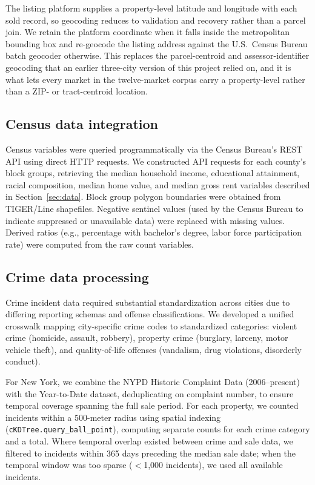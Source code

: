 \documentclass{article}
\begin{document}
The listing platform supplies a property-level latitude and longitude with each sold record, so geocoding reduces to validation and recovery rather than a parcel join. We retain the platform coordinate when it falls inside the metropolitan bounding box and re-geocode the listing address against the U.S.\ Census Bureau batch geocoder otherwise. This replaces the parcel-centroid and assessor-identifier geocoding that an earlier three-city version of this project relied on, and it is what lets every market in the twelve-market corpus carry a property-level rather than a ZIP- or tract-centroid location.

\subsection{Census data integration}

Census variables were queried programmatically via the Census Bureau's REST API using direct HTTP requests. We constructed API requests for each county's block groups, retrieving the median household income, educational attainment, racial composition, median home value, and median gross rent variables described in Section~\ref{sec:data}. Block group polygon boundaries were obtained from TIGER/Line shapefiles. Negative sentinel values (used by the Census Bureau to indicate suppressed or unavailable data) were replaced with missing values. Derived ratios (e.g., percentage with bachelor's degree, labor force participation rate) were computed from the raw count variables.

\subsection{Crime data processing}

Crime incident data required substantial standardization across cities due to differing reporting schemas and offense classifications. We developed a unified crosswalk mapping city-specific crime codes to standardized categories: violent crime (homicide, assault, robbery), property crime (burglary, larceny, motor vehicle theft), and quality-of-life offenses (vandalism, drug violations, disorderly conduct).

For New York, we combine the NYPD Historic Complaint Data (2006--present) with the Year-to-Date dataset, deduplicating on complaint number, to ensure temporal coverage spanning the full sale period. For each property, we counted incidents within a 500-meter radius using spatial indexing (\texttt{cKDTree.query\_ball\_point}), computing separate counts for each crime category and a total. Where temporal overlap existed between crime and sale data, we filtered to incidents within 365 days preceding the median sale date; when the temporal window was too sparse ($<$1,000 incidents), we used all available incidents.
\end{document}
